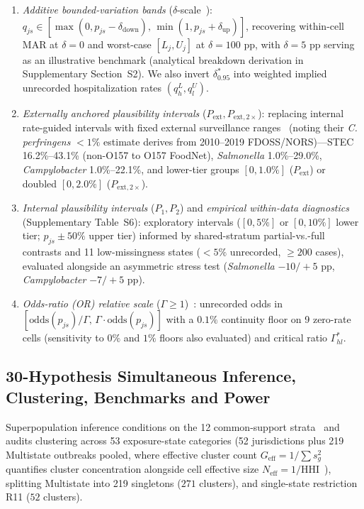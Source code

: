 \begin{enumerate}
  \item \textit{Additive bounded-variation bands} ($\delta$-scale~\cite{ratitch2013missing,liublinska2014sensitivity,manski2018how}): $q_{js} \in [\max(0, p_{js} - \delta_{\text{down}}),\, \min(1, p_{js} + \delta_{\text{up}})]$, recovering within-cell MAR at $\delta = 0$ and worst-case $[L_j, U_j]$ at $\delta = 100\text{ pp}$, with $\delta = 5\text{ pp}$ serving as an illustrative benchmark (analytical breakdown derivation in Supplementary Section~S2). We also invert $\delta^{*}_{0.95}$ into weighted implied unrecorded hospitalization rates $(q^L_{h}, q^U_{l})$.
  \item \textit{Externally anchored plausibility intervals} ($P_{\mathrm{ext}}, P_{\mathrm{ext},2\times}$): replacing internal rate-guided intervals with fixed external surveillance ranges~\cite{scallanwalter2025foodborne,scallan2011foodborne} (noting their \textit{C. perfringens} $<1\%$ estimate derives from 2010--2019 FDOSS/NORS)---STEC 16.2\%--43.1\% (non-O157 to O157 FoodNet), \textit{Salmonella} 1.0\%--29.0\%, \textit{Campylobacter} 1.0\%--22.1\%, and lower-tier groups $[0, 1.0\%]$ ($P_{\mathrm{ext}}$) or doubled $[0, 2.0\%]$ ($P_{\mathrm{ext},2\times}$).
  \item \textit{Internal plausibility intervals} ($P_1, P_2$) and \textit{empirical within-data diagnostics} (Supplementary Table~S6): exploratory intervals ($[0, 5\%]$ or $[0, 10\%]$ lower tier; $p_{js} \pm 50\%$ upper tier) informed by shared-stratum partial-vs.-full contrasts and 11 low-missingness states ($<5\%$ unrecorded, $\ge 200$ cases), evaluated alongside an asymmetric stress test (\textit{Salmonella} $-10/+5\text{ pp}$, \textit{Campylobacter} $-7/+5\text{ pp}$).
  \item \textit{Odds-ratio (OR) relative scale} ($\Gamma \ge 1$)~\cite{little1993pattern,rosenbaum2002observational}: unrecorded odds in $[\text{odds}(p_{js})/\Gamma,\, \Gamma\cdot\text{odds}(p_{js})]$ with a $0.1\%$ continuity floor on 9 zero-rate cells (sensitivity to $0\%$ and $1\%$ floors also evaluated) and critical ratio $\Gamma^{*}_{hl}$.
\end{enumerate}

\subsection{30-Hypothesis Simultaneous Inference, Clustering, Benchmarks and Power}\label{sec:inference}

Superpopulation inference conditions on the 12 common-support strata~\cite{keiding2014standardization} and audits clustering across 53 exposure-state categories (52 jurisdictions plus 219 Multistate outbreaks pooled, where effective cluster count $G_{\text{eff}} = 1/\sum s_g^2$ quantifies cluster concentration alongside cell effective size $N_{\text{eff}} = 1/\mathrm{HHI}$~\cite{carter2017asymptotic}), splitting Multistate into 219 singletons ($271$ clusters), and single-state restriction R11 ($52$ clusters).

